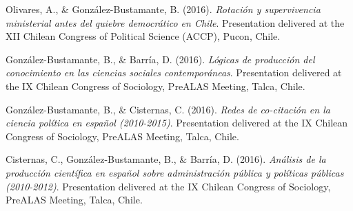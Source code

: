 \begin{publications}
\begin{benumerate}{87}
\item{Olivares, A., \& González-Bustamante, B. (2016). {\itshape Rotación y supervivencia ministerial antes del quiebre democrático en Chile}. Presentation delivered at the XII Chilean Congress of Political Science (ACCP), Pucon, Chile.}\vspace{1mm}


\item{González-Bustamante, B., \& Barría, D. (2016). {\itshape Lógicas de producción del conocimiento en las ciencias sociales contemporáneas}. Presentation delivered at the IX Chilean Congress of Sociology, PreALAS Meeting, Talca, Chile.}\vspace{1mm}


\item{González-Bustamante, B., \& Cisternas, C. (2016). {\itshape Redes de co-citación en la ciencia política en español (2010-2015)}. Presentation delivered at the IX Chilean Congress of Sociology, PreALAS Meeting, Talca, Chile.}\vspace{1mm}


\item{Cisternas, C., González-Bustamante, B., \& Barría, D. (2016). {\itshape Análisis de la producción científica en español sobre administración pública y políticas públicas (2010-2012)}. Presentation delivered at the IX Chilean Congress of Sociology, PreALAS Meeting, Talca, Chile.}\vspace{1mm}


\end{benumerate}
\end{publications}
